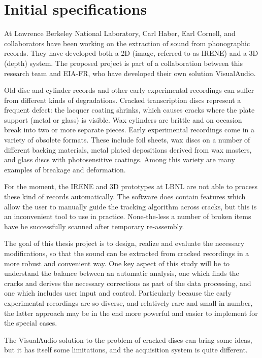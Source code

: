 \newpage

\section{Initial specifications}
\label{sec:initstatement}

At Lawrence Berkeley National Laboratory, Carl Haber, Earl Cornell, and collaborators have been working on the extraction of sound from phonographic records. They have developed both a 2D (image, referred to as IRENE) and a 3D (depth) system. The proposed project is part of a collaboration between this research team and EIA-FR, who have developed their own solution VisualAudio.

Old disc and cylinder records and other early experimental recordings can suffer from different kinds of degradations. Cracked transcription discs represent a frequent defect: the lacquer coating shrinks, which causes cracks where the plate support (metal or glass) is visible. Wax cylinders are brittle and on occasion break into two or more separate pieces. Early experimental recordings come in a variety of obsolete formats. These include foil sheets, wax discs on a number of different backing materials, metal plated depositions derived from wax masters, and glass discs with photosensitive coatings. Among this variety are many examples of breakage and deformation.

For the moment, the IRENE and 3D prototypes at LBNL are not able to process these kind of records automatically. The software does contain features which allow the user to manually guide the tracking algorithm across cracks, but this is an inconvenient tool to use in practice. None-the-less a number of broken items have be successfully scanned after temporary re-assembly.

The goal of this thesis project is to design, realize and evaluate the necessary modifications, so that the sound can be extracted from cracked recordings in a more robust and convenient way. One key aspect of this study will be to understand the balance between an automatic analysis, one which finds the cracks and derives the necessary corrections as part of the data processing, and one which includes user input and control. Particularly because the early experimental recordings are so diverse, and relatively rare and small in number, the latter approach may be in the end more powerful and easier to implement for the special cases.

The VisualAudio solution to the problem of cracked discs can bring some ideas, but it has itself some limitations, and the acquisition system is quite different.

